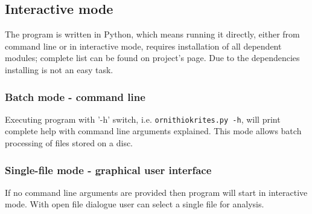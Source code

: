 \documentclass[paper=a4, fontsize=11pt]{scrartcl}	%
\numberwithin{equation}{section}		%
\numberwithin{figure}{section}			%
\numberwithin{table}{section}				%
\begin{document}
\subsection{Interactive mode}
\label{sec:interactive_mode}
The program is written in Python, which means running it directly, either from command line or in interactive mode, requires installation of all dependent modules; complete list can be found on project's page. Due to the dependencies installing is not an easy task.
\subsubsection{Batch mode - command line}
Executing program with '-h' switch, i.e. \texttt{ornithiokrites.py -h}, will print complete help with command line arguments explained. This mode allows batch processing of files stored on a disc.
\subsubsection{Single-file mode - graphical user interface}
If no command line arguments are provided then program will start in interactive mode. With open file dialogue user can select a single file for analysis.
\end{document}
